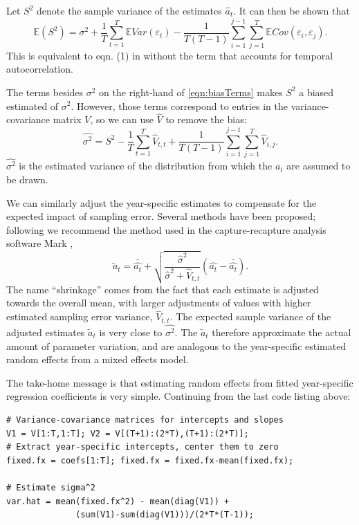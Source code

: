 \documentclass[12pt]{article}
\newcommand{\be}{\begin{equation}}
\newcommand{\ee}{\end{equation}}
\begin{document}
\begin{spacing}{1.35}
Let $S^2$ denote the sample variance of the estimates $\hat{a}_t$. It can then be shown that 
\be
\mathbb{E}(S^2) = \sigma^2  + \frac{1}{T}\sum\limits_{t=1}^T \mathbb{E} Var(\varepsilon_t) 
- \frac{1}{T(T-1)}\sum\limits_{i=1}^{j-1} \sum\limits_{j=1}^T \mathbb{E}Cov(\varepsilon_i, \varepsilon_j). 
\label{eqn:biasTerms}
\ee
This is equivalent to eqn. (1) in \citet{gould-nichols-1998} without the term that 
accounts for temporal autocorrelation. 

The terms besides $\sigma^2$ on the right-hand of \eqref{eqn:biasTerms} makes $S^2$ a biased estimated of $\sigma^2$. 
However, those terms correspond to entries in the variance-covariance matrix $V$, so we can use $\hat{V}$ to remove 
the bias: 
\be
\hat{\sigma^2}  = S^2 - \frac{1}{T}\sum\limits_{t=1}^T \hat{V}_{t,t} + 
\frac{1}{T(T-1)}\sum\limits_{i=1}^{j-1} \sum\limits_{j=1}^T \hat{V}_{i,j}. 
\label{eqn:hatSigma}
\ee
$\hat{\sigma^2}$ is the estimated variance of the distribution from which the $a_t$ are assumed
to be drawn. 

We can similarly adjust the year-specific estimates to compensate for the expected impact of sampling error. Several methods  
have been proposed; following \citet{metcalf-etal-2015} we recommend the method used in the 
capture-recapture analysis software Mark \citet{cooch-white-2020}, 
\be
\widetilde{a}_t = \bar{\hat{a_t}} + \sqrt{\frac{\hat{\sigma}^2}{\hat{\sigma}^2 + \hat{V}_{t,t}}}\left (\hat{a_t} - \bar{\hat{a_t}} \right). 
\label{eqn:ShrinkLess}
\ee
The name ``shrinkage'' comes from the fact that each estimate is adjusted towards the overall mean, with 
larger adjustments of values with higher estimated sampling error variance, $\hat{V}_{t,t}$. 
The expected sample variance of the adjusted estimates $\widetilde{a}_t$ is very close to $\hat{\sigma^2}$. 
The $\widetilde{a}_t$ therefore approximate the actual amount of parameter variation, and are analogous to the 
year-specific estimated random effects from a mixed effects model. 

The take-home message is that estimating random effects from fitted year-specific regression 
coefficients is very simple. Continuing from the last code listing above: 
\begin{lstlisting}
# Variance-covariance matrices for intercepts and slopes
V1 = V[1:T,1:T]; V2 = V[(T+1):(2*T),(T+1):(2*T)]; 
# Extract year-specific intercepts, center them to zero   
fixed.fx = coefs[1:T]; fixed.fx = fixed.fx-mean(fixed.fx); 

# Estimate sigma^2
var.hat = mean(fixed.fx^2) - mean(diag(V1)) + 
              (sum(V1)-sum(diag(V1)))/(2*T*(T-1)); 


\end{lstlisting}
\end{spacing}
\end{document}

